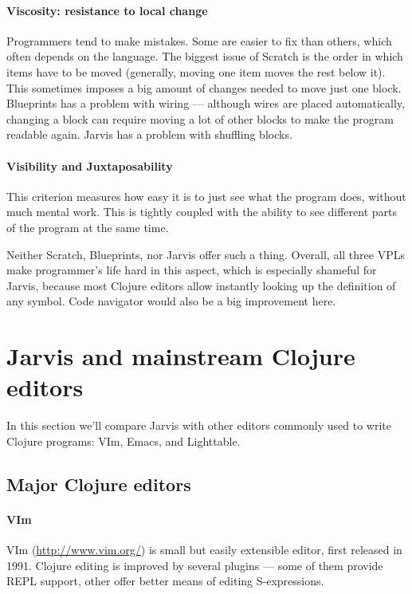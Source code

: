\documentclass[english,mgr,shortabstract]{iithesis}
\begin{document}
\subsubsection*{Viscosity: resistance to local change}
Programmers tend to make mistakes.
Some are easier to fix than others, which often depends on the language.
The biggest issue of Scratch is the order in which items have to be moved
(generally, moving one item moves the rest below it).
This sometimes imposes a big amount of changes needed to move just one block.
Blueprints has a problem with wiring --- although wires are placed automatically,
changing a block can require moving a lot of other blocks to make the program
readable again.
Jarvis has a problem with shuffling blocks.

\subsubsection*{Visibility and Juxtaposability}
This criterion measures how easy it is to just see what the program does,
without much mental work.
This is tightly coupled with the ability to see different parts of the program
at the same time.

Neither Scratch, Blueprints, nor Jarvis offer such a thing.
Overall, all three VPLs make programmer’s life hard in this aspect, which is
especially shameful for Jarvis, because most Clojure editors allow instantly
looking up the definition of any symbol.
Code navigator would also be a big improvement here.

\chapter{Jarvis and mainstream Clojure editors}
In this section we'll compare Jarvis with other editors commonly used to write
Clojure programs: VIm, Emacs, and Lighttable.

\section{Major Clojure editors}
\subsubsection*{VIm}
VIm (\url{http://www.vim.org/}) is small but easily extensible editor, first
released in 1991. Clojure editing is improved by several plugins --- some of
them provide REPL support, other offer better means of editing S-expressions.
\end{document}
